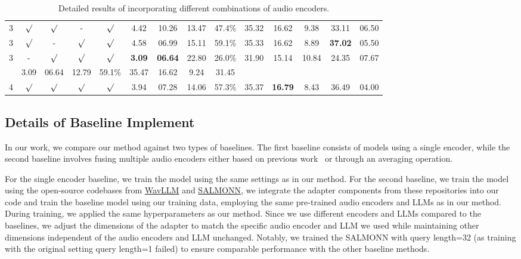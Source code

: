 \begin{table*}[htp]
{\begin{tabular}{c c c c c c c c c c c c c c}
3 & $\surd$ & $\surd$ & - & $\surd$ & 4.42 & 10.26 & 13.47 & 47.4\% & 35.32 & 16.62 & 9.38 & 33.11 & 06.50 \\
3 & $\surd$ & - & $\surd$ & $\surd$ & 4.58 & 06.99 & 15.11 & 59.1\% & 35.33 & 16.62 & 8.89 & \textbf{37.02} & 05.50 \\
3 & - & $\surd$ & $\surd$ & $\surd$ & \textbf{3.09} & \textbf{06.64} & 22.80 & 26.0\% & 31.90 & 15.14 & 10.84 & 24.35 & 07.67 \\
\midrule
\rowcolor{black!10} \multicolumn{5}{l}{Best-3} & 3.09 & 06.64 & 12.79 & 59.1\% & 35.47 & 16.62 & 9.24 & 31.45 & \\
\midrule
4 & $\surd$ & $\surd$ & $\surd$ & $\surd$ & 3.94 & 07.28 & 14.06 & 57.3\% & 35.37 & \textbf{16.79} & 8.43 & 36.49 & 04.00 \\
\bottomrule
\end{tabular}}
\caption{Detailed results of incorporating different combinations of audio encoders.}
\label{tab:results-multiple-encoder}
\end{table*}

\subsection{Details of Baseline Implement}\label{sec:appendix-baseline-implement}

In our work, we compare our method against two types of baselines. The first baseline consists of models using a single encoder, while the second baseline involves fusing multiple audio encoders either based on previous work~\cite{hu2024wavllmrobustadaptivespeech, tang2024salmonn} or through an averaging operation. 

For the single encoder baseline, we train the model using the same settings as in our method. For the second baseline, we train the model using the open-source codebases from \href{https://github.com/microsoft/SpeechT5/tree/main/WavLLM}{WavLLM} and \href{https://github.com/bytedance/SALMONN}{SALMONN}, we integrate the adapter components from these repositories into our code and train the baseline model using our training data, employing the same pre-trained audio encoders and LLMs as in our method. During training, we applied the same hyperparameters as our method. Since we use different encoders and LLMs compared to the baselines, we adjust the dimensions of the adapter to match the specific audio encoder and LLM we used while maintaining other dimensions independent of the audio encoders and LLM unchanged. Notably, we trained the SALMONN with query length=32 (as training with the original setting query length=1 failed) to ensure comparable performance with the other baseline methods.

